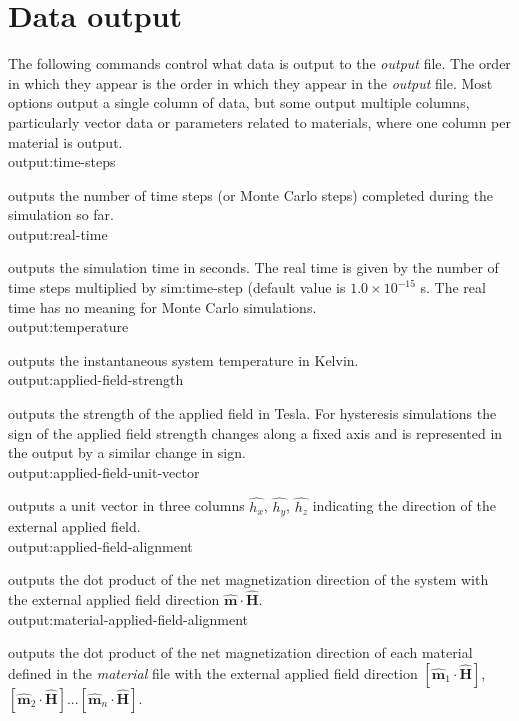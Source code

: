 \section*{Data output}
The following commands control what data is output to the \textit{output} file. The order in which they appear is the order in which they appear in the \textit{output} file. Most options output a single column of data, but some output multiple columns, particularly vector data or parameters related to materials, where one column per material is output.\\

{\zicf output:time-steps} outputs the number of time steps (or Monte Carlo steps) completed during the simulation so far.\\

{\zicf output:real-time} outputs the simulation time in seconds. The real time is given by the number of time steps multiplied by sim:time-step (default value is $1.0 \times 10^{-15}$ s. The real time has no meaning for Monte Carlo simulations.\\

{\zicf output:temperature} outputs the instantaneous system temperature in Kelvin.\\

{\zicf output:applied-field-strength} outputs the strength of the applied field in Tesla. For hysteresis simulations the sign of the applied field strength changes along a fixed axis and is represented in the output by a similar change in sign.\\

{\zicf output:applied-field-unit-vector} outputs a unit vector in three columns $\hat{h_x}$, $\hat{h_y}$, $\hat{h_z}$ indicating the direction of the external applied field.\\

{\zicf output:applied-field-alignment} outputs the dot product of the net magnetization direction of the system with the external applied field direction $\hat{\mathbf{m}} \cdot \hat{\mathbf{H}}$.\\

{\zicf output:material-applied-field-alignment} outputs the dot product of the net magnetization direction of each material defined in the \textit{material} file with the external applied field direction $\left[\hat{\mathbf{m}}_1 \cdot \hat{\mathbf{H}}\right]$, $\left[\hat{\mathbf{m}}_2 \cdot \hat{\mathbf{H}}\right]$...$\left[\hat{\mathbf{m}}_n \cdot \hat{\mathbf{H}}\right]$.\\

